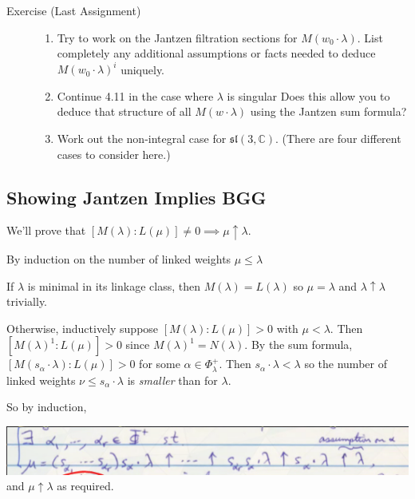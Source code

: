 \documentclass[11pt]{scrartcl}
\theoremstyle{definition}
\theoremstyle{theorem}
\theoremstyle{proof}
\newenvironment{proof}
{\pushQED{$\qed$}\pf}
{\par\popQED\endpf}
\theoremstyle{definition}
\theoremstyle{break}
\theoremstyle{problem}
\providecommand{\tightlist}{%
  \setlength{\itemsep}{0pt}\setlength{\parskip}{0pt}}
\newcommand{\CC}[0]{{\mathbb{C}}}
\newcommand{\up}[0]{\uparrow}
\newcommand{\liesl}[0]{{\mathfrak{sl}}}
\renewcommand{\qed}[0]{\hfill\blacksquare}
\begin{document}
\begin{description}
\item[Exercise (Last Assignment)]
\hfill

\begin{enumerate}
\def\labelenumi{\arabic{enumi}.}
\tightlist
\item
  Try to work on the Jantzen filtration sections for
  \(M(w_0 \cdot \lambda)\). List completely any additional assumptions
  or facts needed to deduce \(M(w_0 \cdot \lambda)^i\) uniquely.
\item
  Continue 4.11 in the case where \(\lambda\) is singular Does this
  allow you to deduce that structure of all \(M(w\cdot \lambda)\) using
  the Jantzen sum formula?
\item
  Work out the non-integral case for \(\liesl(3, \CC)\). (There are four
  different cases to consider here.)
\end{enumerate}
\end{description}

\hypertarget{showing-jantzen-implies-bgg}{%
\subsection{Showing Jantzen Implies
BGG}\label{showing-jantzen-implies-bgg}}

We'll prove that
\([M(\lambda) : L(\mu)] \neq 0 \implies \mu \up \lambda\).

\begin{proof}

By induction on the number of linked weights \(\mu \leq \lambda\)

If \(\lambda\) is minimal in its linkage class, then
\(M(\lambda) = L(\lambda)\) so \(\mu = \lambda\) and
\(\lambda \up \lambda\) trivially.

Otherwise, inductively suppose \([M(\lambda): L(\mu)] > 0\) with
\(\mu < \lambda\). Then \([M(\lambda)^1: L(\mu)] > 0\) since
\(M(\lambda)^1 = N(\lambda)\). By the sum formula,
\([M(s_\alpha \cdot \lambda) : L(\mu)] > 0\) for some
\(\alpha \in \Phi_\lambda^+\). Then \(s_\alpha \cdot \lambda < \lambda\)
so the number of linked weights \(\nu \leq s_\alpha \cdot \lambda\) is
\emph{smaller} than for \(\lambda\).

So by induction,

\includegraphics{figures/2020-04-03-09:47.png}\\

and \(\mu \up \lambda\) as required.\end{proof}
\end{document}
